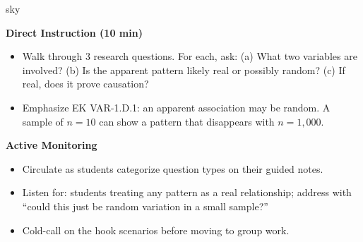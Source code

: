 \documentclass[10pt]{article}
\begin{document}
\begin{skillbox}{sky}
\begin{minipage}[t]{0.48\linewidth}
    \textbf{Direct Instruction (10 min)}
    \begin{itemize}
        \item Walk through 3 research questions. For each, ask:
          (a) What two variables are involved?
          (b) Is the apparent pattern likely real or possibly random?
          (c) If real, does it prove causation?
        \item Emphasize EK VAR-1.D.1: an apparent association may be random.
          A sample of $n = 10$ can show a pattern that disappears with $n = 1{,}000$.
    \end{itemize}
\end{minipage}
\hfill
\begin{minipage}[t]{0.48\linewidth}
    \textbf{Active Monitoring}
    \begin{itemize}
        \item Circulate as students categorize question types on their guided notes.
        \item Listen for: students treating any pattern as a real relationship;
          address with ``could this just be random variation in a small sample?''
        \item Cold-call on the hook scenarios before moving to group work.
    \end{itemize}
\end{minipage}
\end{skillbox}
\end{document}
